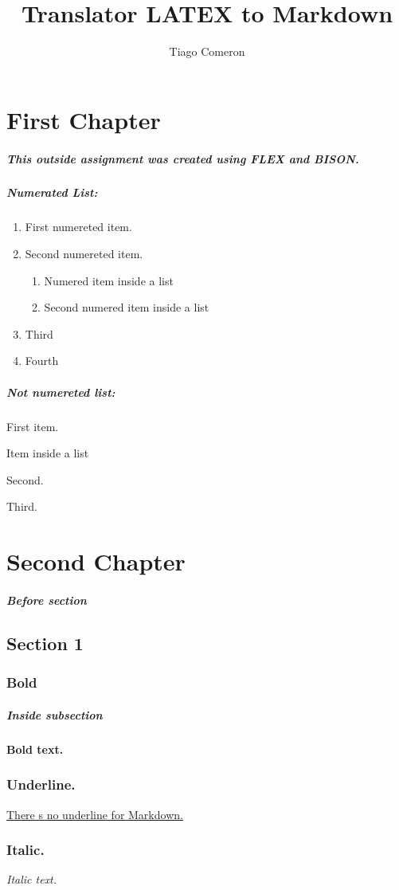 \documentclass{report}
\title{Translator LATEX to Markdown}
\author{Tiago Comeron}
\begin{document}
\chapter{First Chapter}
\paragraph{This outside assignment was created using FLEX and BISON.}
\paragraph{Numerated List:}
\begin{enumerate}
\item{First numereted item.}
\item{Second numereted item.}
\begin{enumerate}
\item{Numered item inside a list}
\item{Second numered item inside a list}
\end{enumerate}
\item{Third}
\item{Fourth}
\end{enumerate}
\paragraph{Not numereted list:}
\begin{itemsize}
\item{First item.}
\begin{itemsize}
\item{Item inside a list}
\end{itemsize}
\item{Second.}
\item{Third.}
\end{itemsize}
\paragraph{ }
\chapter{Second Chapter}
\paragraph{Before section}
\section{Section 1}
\subsection{Bold}
\paragraph{Inside subsection}
\bf{Bold text.}
\subsection{Underline.}
\underline{There s no underline for Markdown.}
\subsection{Italic.}
\it{Italic text.}
\end{document}
